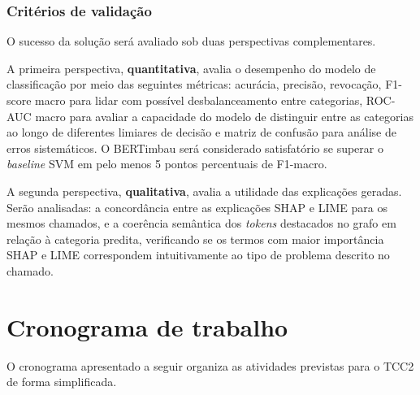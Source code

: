 \documentclass[
    12pt,                %
    openright,           %
    oneside,             %
    a4paper,             %
    english,             %
    brazil               %
]{abntex2}
\begin{document}
\subsubsection{Critérios de validação}

O sucesso da solução será avaliado sob duas perspectivas complementares.

A primeira perspectiva, \textbf{quantitativa}, avalia o desempenho do modelo de classificação por meio das seguintes métricas: acurácia, precisão, revocação, F1-score macro para lidar com possível desbalanceamento entre categorias, ROC-AUC macro para avaliar a capacidade do modelo de distinguir entre as categorias ao longo de 
diferentes limiares de decisão e matriz de confusão para análise de erros sistemáticos. O BERTimbau será considerado satisfatório se superar o \textit{baseline} SVM em pelo menos 5 pontos percentuais de F1-macro.

A segunda perspectiva, \textbf{qualitativa}, avalia a utilidade das explicações geradas. Serão analisadas: a concordância entre as explicações SHAP e LIME para os mesmos chamados, e a coerência semântica dos \textit{tokens} destacados no grafo em relação à categoria predita, verificando se os termos com maior importância SHAP e LIME 
correspondem intuitivamente ao tipo de problema descrito 
no chamado.

\section{Cronograma de trabalho}
\label{sec:cronograma}

O cronograma apresentado a seguir organiza as atividades previstas para o TCC2 de forma simplificada.
\end{document}
